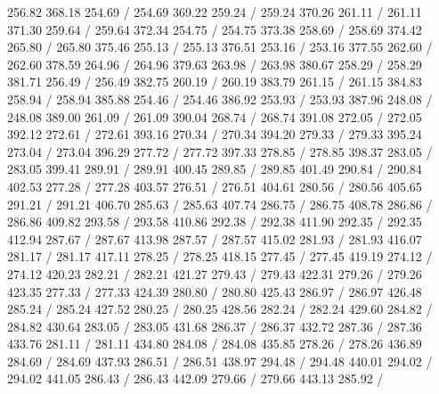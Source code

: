 { 256.82 368.18 254.69 /
 254.69 369.22 259.24 /
 259.24 370.26 261.11 /
 261.11 371.30 259.64 /
 259.64 372.34 254.75 /
 254.75 373.38 258.69 /
 258.69 374.42 265.80 /
 265.80 375.46 255.13 /
 255.13 376.51 253.16 /
 253.16 377.55 262.60 /
 262.60 378.59 264.96 /
 264.96 379.63 263.98 /
 263.98 380.67 258.29 /
 258.29 381.71 256.49 /
 256.49 382.75 260.19 /
 260.19 383.79 261.15 /
 261.15 384.83 258.94 /
 258.94 385.88 254.46 /
 254.46 386.92 253.93 /
 253.93 387.96 248.08 /
 248.08 389.00 261.09 /
 261.09 390.04 268.74 /
 268.74 391.08 272.05 /
 272.05 392.12 272.61 /
 272.61 393.16 270.34 /
 270.34 394.20 279.33 /
 279.33 395.24 273.04 /
 273.04 396.29 277.72 /
 277.72 397.33 278.85 /
 278.85 398.37 283.05 /
 283.05 399.41 289.91 /
 289.91 400.45 289.85 /
 289.85 401.49 290.84 /
 290.84 402.53 277.28 /
 277.28 403.57 276.51 /
 276.51 404.61 280.56 /
 280.56 405.65 291.21 /
 291.21 406.70 285.63 /
 285.63 407.74 286.75 /
 286.75 408.78 286.86 /
 286.86 409.82 293.58 /
 293.58 410.86 292.38 /
 292.38 411.90 292.35 /
 292.35 412.94 287.67 /
 287.67 413.98 287.57 /
 287.57 415.02 281.93 /
 281.93 416.07 281.17 /
 281.17 417.11 278.25 /
 278.25 418.15 277.45 /
 277.45 419.19 274.12 /
 274.12 420.23 282.21 /
 282.21 421.27 279.43 /
 279.43 422.31 279.26 /
 279.26 423.35 277.33 /
 277.33 424.39 280.80 /
 280.80 425.43 286.97 /
 286.97 426.48 285.24 /
 285.24 427.52 280.25 /
 280.25 428.56 282.24 /
 282.24 429.60 284.82 /
 284.82 430.64 283.05 /
 283.05 431.68 286.37 /
 286.37 432.72 287.36 /
 287.36 433.76 281.11 /
 281.11 434.80 284.08 /
 284.08 435.85 278.26 /
 278.26 436.89 284.69 /
 284.69 437.93 286.51 /
 286.51 438.97 294.48 /
 294.48 440.01 294.02 /
 294.02 441.05 286.43 /
 286.43 442.09 279.66 /
 279.66 443.13 285.92 /
}
